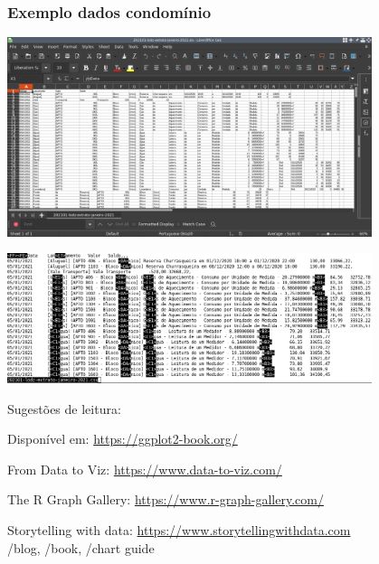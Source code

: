 \begin{frame}
\frametitle{Exemplo dados condomínio}
\centering
\includegraphics[width=0.8\textwidth,height=0.7\textheight,keepaspectratio]{examples/lodz-planilha-xls.png}

\framebreak
\includegraphics[width=0.8\textwidth,height=0.7\textheight,keepaspectratio]{examples/lodz-planilha-csv.png}

\framebreak


\framebreak


\framebreak


\framebreak



\end{frame}



\begin{frame}
Sugestões de leitura: 
\vspace{2ex}

Disponível em: \url{https://ggplot2-book.org/}

\vspace{3ex}
From Data to Viz: \url{https://www.data-to-viz.com/}

\vspace{3ex}
The R Graph Gallery: \url{https://www.r-graph-gallery.com/}

\vspace{3ex}
Storytelling with data: \url{https://www.storytellingwithdata.com}\\
/blog, /book, /chart guide

\end{frame}
